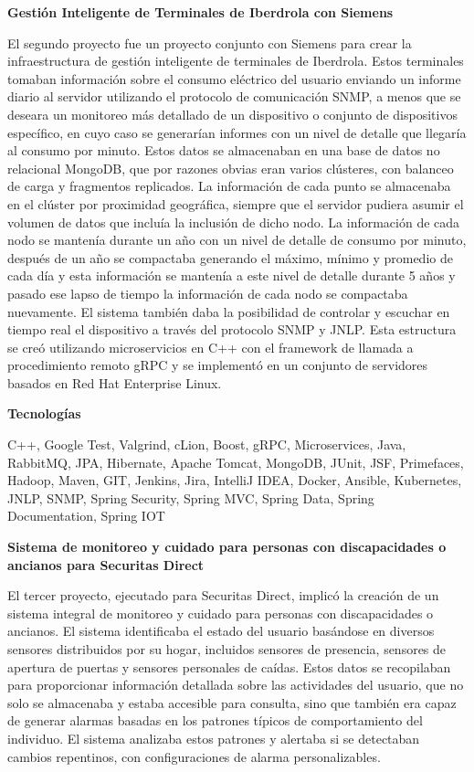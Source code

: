 \documentclass[a4paper,10pt]{article}
\newcommand{\cvsubsubsection}[1]{
\begin{tcolorbox}[colback=gray!10, colframe=gray!10, boxrule=0pt, arc=0mm, outer arc=0mm, width=\textwidth, boxsep=0pt, left=4mm, right=4mm, top=1mm, bottom=1mm]
  \textbf{#1}
\end{tcolorbox}
\vspace{1mm}
}
\newcommand{\cvsubsubsubsection}[1]{
  \begin{tcolorbox}[colback=gray!5, colframe=gray!5, boxrule=0pt, arc=0mm, outer arc=0mm, width=\textwidth, boxsep=0pt, left=6mm, right=6mm, top=1mm, bottom=1mm]
    \textbf{#1}
  \end{tcolorbox}
  \vspace{1mm}
}
\begin{document}
\cvsubsubsection{Gestión Inteligente de Terminales de Iberdrola con Siemens}
El segundo proyecto fue un proyecto conjunto con Siemens para crear la infraestructura de gestión inteligente de terminales de Iberdrola. Estos terminales tomaban información sobre el consumo eléctrico del usuario enviando un informe diario al servidor utilizando el protocolo de comunicación SNMP, a menos que se deseara un monitoreo más detallado de un dispositivo o conjunto de dispositivos específico, en cuyo caso se generarían informes con un nivel de detalle que llegaría al consumo por minuto. Estos datos se almacenaban en una base de datos no relacional MongoDB, que por razones obvias eran varios clústeres, con balanceo de carga y fragmentos replicados. La información de cada punto se almacenaba en el clúster por proximidad geográfica, siempre que el servidor pudiera asumir el volumen de datos que incluía la inclusión de dicho nodo. La información de cada nodo se mantenía durante un año con un nivel de detalle de consumo por minuto, después de un año se compactaba generando el máximo, mínimo y promedio de cada día y esta información se mantenía a este nivel de detalle durante 5 años y pasado ese lapso de tiempo la información de cada nodo se compactaba nuevamente. El sistema también daba la posibilidad de controlar y escuchar en tiempo real el dispositivo a través del protocolo SNMP y JNLP. Esta estructura se creó utilizando microservicios en C++ con el framework de llamada a procedimiento remoto gRPC y se implementó en un conjunto de servidores basados en Red Hat Enterprise Linux.

\cvsubsubsubsection{Tecnologías}
C++, Google Test, Valgrind, cLion, Boost, gRPC, Microservices, Java, RabbitMQ, JPA, Hibernate, Apache Tomcat, MongoDB, JUnit, JSF, Primefaces, Hadoop, Maven, GIT, Jenkins, Jira, IntelliJ IDEA, Docker, Ansible, Kubernetes, JNLP, SNMP, Spring Security, Spring MVC, Spring Data, Spring Documentation, Spring IOT

\cvsubsubsection{Sistema de monitoreo y cuidado para personas con discapacidades o ancianos para Securitas Direct}
El tercer proyecto, ejecutado para Securitas Direct, implicó la creación de un sistema integral de monitoreo y cuidado para personas con discapacidades o ancianos. El sistema identificaba el estado del usuario basándose en diversos sensores distribuidos por su hogar, incluidos sensores de presencia, sensores de apertura de puertas y sensores personales de caídas. Estos datos se recopilaban para proporcionar información detallada sobre las actividades del usuario, que no solo se almacenaba y estaba accesible para consulta, sino que también era capaz de generar alarmas basadas en los patrones típicos de comportamiento del individuo. El sistema analizaba estos patrones y alertaba si se detectaban cambios repentinos, con configuraciones de alarma personalizables.
\end{document}
